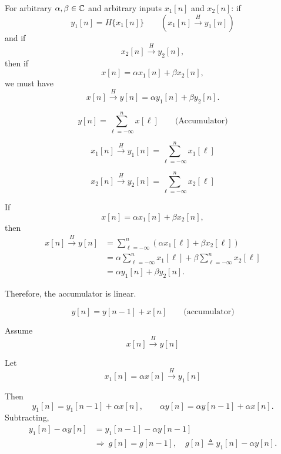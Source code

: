 \documentclass[handout_subfiles_root.tex]{subfiles}
\begin{document}
\label{sec:linearity}

\begin{defbox}[title={Definition (Linearity)}]
For arbitrary $\alpha,\beta \in \mathbb{C}$ and arbitrary inputs $x_1[n]$ and
$x_2[n]$: if
\[
y_1[n] = H\{x_1[n]\}
\qquad
\left(x_1[n] \xrightarrow{H} y_1[n]\right)
\]
and if
\[
x_2[n] \xrightarrow{H} y_2[n],
\]
then if
\[
x[n] = \alpha x_1[n] + \beta x_2[n],
\]
we must have
\[
x[n] \xrightarrow{H} y[n]
= \alpha y_1[n] + \beta y_2[n].
\]
\end{defbox}

\begin{examplebox}[title={Example (Accumulator is Linear)}]
\[
y[n]=\sum_{\ell=-\infty}^{n}x[\ell]
\qquad
\text{(Accumulator)}
\]

\[
x_1[n] \xrightarrow{H} y_1[n]
= \sum_{\ell=-\infty}^{n} x_1[\ell]
\]

\[
x_2[n] \xrightarrow{H} y_2[n]
= \sum_{\ell=-\infty}^{n} x_2[\ell]
\]

If
\[
x[n]=\alpha x_1[n]+\beta x_2[n],
\]
then
\begin{align*}
x[n] \xrightarrow{H} y[n]
&= \sum_{\ell=-\infty}^{n}
   \left(\alpha x_1[\ell]+\beta x_2[\ell]\right) \\
&= \alpha\sum_{\ell=-\infty}^{n}x_1[\ell]
 + \beta\sum_{\ell=-\infty}^{n}x_2[\ell] \\
&= \alpha y_1[n]+\beta y_2[n].
\end{align*}

Therefore, the accumulator is linear.
\end{examplebox}


\begin{examplebox}[title={Example}]
\[
y[n] = y[n-1] + x[n]
\qquad
\text{(accumulator)}
\]

Assume
\[
x[n] \xrightarrow{H} y[n]
\]

Let
\[
x_1[n] = \alpha x[n] \xrightarrow{H} y_1[n]
\]

Then
\[
y_1[n] = y_1[n-1] + \alpha x[n], \qquad
\alpha y[n] = \alpha y[n-1] + \alpha x[n].
\]
Subtracting,
\begin{align*}
y_1[n] - \alpha y[n] &= y_1[n-1] - \alpha y[n-1] \\
&\Longrightarrow\ g[n] = g[n-1], \quad g[n] \triangleq y_1[n]-\alpha y[n].
\end{align*}
\end{examplebox}
\end{document}
